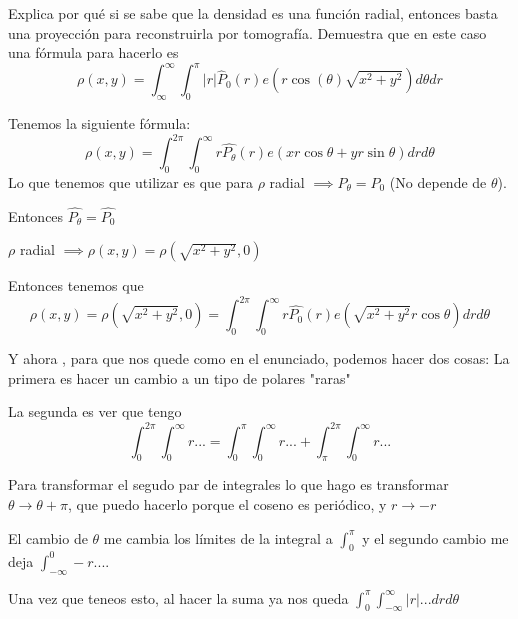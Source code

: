 \begin{problem}[14]
Explica por qué si se sabe que la densidad es una función radial, entonces basta una proyección para reconstruirla por tomografía. Demuestra que en este caso una fórmula para hacerlo es
\[ρ(x,y)=\int_{\infty}^{\infty} \int_0^π |r|\hat{P}_0(r)e(r\cos(\theta) \sqrt{x^2+y^2})d\theta dr\]
\solution

Tenemos la siguiente fórmula:
\[\rho (x,y) = \int_{0}^{2\pi}\int_{0}^{\infty} r \widehat{P_{\theta}}(r) e(xr\cos\theta + y r \sin\theta) dr d\theta\]
Lo que tenemos que utilizar es que para $\rho$ radial $\implies P_{\theta} = P_0$ (No depende de $\theta$).

Entonces $\widehat{P_{\theta}} = \widehat{P_0}$

$\rho$ radial $\implies \rho(x,y) = \rho(\sqrt{x^2+ y^2}, 0)$

Entonces tenemos que
\[\rho(x,y) = \rho(\sqrt{x^2+ y^2}, 0) = \int_{0}^{2\pi}\int_{0}^{\infty} r \widehat{P_0}(r) e(\sqrt{x^2 + y^2}r\cos\theta) dr d\theta\]

Y ahora , para que nos quede como en el enunciado, podemos hacer dos cosas: La primera es hacer un cambio a un tipo de polares "raras"

La segunda es ver que tengo
\[\int_{0}^{2\pi}\int_{0}^{\infty} r... = \int_{0}^{\pi}\int_{0}^{\infty} r... + \int_{\pi}^{2\pi}\int_{0}^{\infty} r...\]

 Para transformar el segudo par de integrales lo que hago es transformar $\theta \rightarrow \theta + \pi$, que puedo hacerlo porque el coseno es periódico,  y $r \rightarrow -r$

El cambio de $\theta$ me cambia los límites de la integral a $\int_{0}^{\pi}$ y el segundo cambio me deja $\int_{-\infty}^{0} -r ....$

Una vez que teneos esto, al hacer la suma ya nos queda $\int_{0}^{\pi} \int_{-\infty}^{\infty} |r|... drd\theta$
\end{problem}

